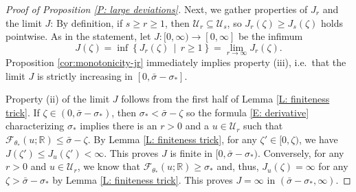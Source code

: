 \documentclass[10pt,a4paper]{amsart}
\begin{document}
\begin{proof}[Proof of Proposition \ref{P: large deviations}]
		
        
        Next, we gather properties of $ J_r $ and the limit $ J $: By definition, if $s \geq r \geq 1$, then $\mathcal{U}_{r} \subseteq \mathcal{U}_{s}$, so $J_{r}(\zeta) \geq J_{s}(\zeta)$ holds pointwise.  As in the statement, let $J : [0,\infty) \to [0,\infty]$ be the infimum
        \begin{equation}\label{eqn:defn-j-alternative}
            J(\zeta) = \inf \left\{ J_{r}(\zeta) \, \mid \, r \geq 1 \right\} = \lim_{ r \to \infty } J_{r}(\zeta).
        \end{equation}
       	Proposition \ref{cor:monotonicity-jr} immediately implies property (iii), i.e.~that the limit $ J $ is strictly increasing in $[0,\bar{\sigma}-\sigma_{*}]$.
	
        Property (ii) of the limit $ J $ follows from the first half of Lemma \ref{L: finiteness trick}. If $\zeta \in (0,\bar{\sigma} - \sigma_{*})$, then $\sigma_{*} <\bar{\sigma} - \zeta$ so the formula \eqref{E: derivative} characterizing $\sigma_{*}$ implies there is an $r > 0$ and a $u \in \mathcal{U}_{r}$ such that $\mathscr{F}_{\theta_{*}}(u;\mathbb{R}) \leq \bar{\sigma} - \zeta$.  By Lemma \ref{L: finiteness trick}, for any $\zeta' \in [0,\zeta)$, we have $J(\zeta') \leq J_{u}(\zeta') < \infty$.  This proves $J$ is finite in $[0,\bar{\sigma} - \sigma_{*})$.  
        Conversely, for any $r > 0$ and $u \in \mathcal{U}_{r}$, we know that $\mathscr{F}_{\theta_{*}}(u;\mathbb{R}) \geq \sigma_{*}$ and, thus, $J_{u}(\zeta) = \infty$ for any $\zeta > \bar{\sigma} - \sigma_{*}$ by Lemma \ref{L: finiteness trick}.  This proves $J = \infty$ in $(\bar{\sigma}-\sigma_{*},\infty)$.     
        

\end{proof}
\end{document}
